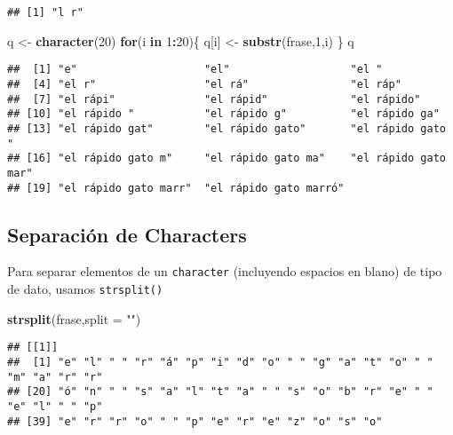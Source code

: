 \documentclass[]{article}
\newenvironment{Shaded}{\begin{snugshade}}{\end{snugshade}}
\newcommand{\KeywordTok}[1]{\textcolor[rgb]{0.13,0.29,0.53}{\textbf{#1}}}
\newcommand{\DataTypeTok}[1]{\textcolor[rgb]{0.13,0.29,0.53}{#1}}
\newcommand{\DecValTok}[1]{\textcolor[rgb]{0.00,0.00,0.81}{#1}}
\newcommand{\StringTok}[1]{\textcolor[rgb]{0.31,0.60,0.02}{#1}}
\newcommand{\ControlFlowTok}[1]{\textcolor[rgb]{0.13,0.29,0.53}{\textbf{#1}}}
\newcommand{\OperatorTok}[1]{\textcolor[rgb]{0.81,0.36,0.00}{\textbf{#1}}}
\newcommand{\NormalTok}[1]{#1}
\begin{document}
\begin{verbatim}
## [1] "l r"
\end{verbatim}

\begin{Shaded}
\begin{Highlighting}[]
\NormalTok{q <-}\StringTok{ }\KeywordTok{character}\NormalTok{(}\DecValTok{20}\NormalTok{)}
\ControlFlowTok{for}\NormalTok{(i }\ControlFlowTok{in} \DecValTok{1}\OperatorTok{:}\DecValTok{20}\NormalTok{)\{}
\NormalTok{  q[i] <-}\StringTok{ }\KeywordTok{substr}\NormalTok{(frase,}\DecValTok{1}\NormalTok{,i)}
\NormalTok{\}}
\NormalTok{q}
\end{Highlighting}
\end{Shaded}

\begin{verbatim}
##  [1] "e"                    "el"                   "el "                 
##  [4] "el r"                 "el rá"                "el ráp"              
##  [7] "el rápi"              "el rápid"             "el rápido"           
## [10] "el rápido "           "el rápido g"          "el rápido ga"        
## [13] "el rápido gat"        "el rápido gato"       "el rápido gato "     
## [16] "el rápido gato m"     "el rápido gato ma"    "el rápido gato mar"  
## [19] "el rápido gato marr"  "el rápido gato marró"
\end{verbatim}

\subsection{Separación de Characters}\label{separaciuxf3n-de-characters}

Para separar elementos de un \texttt{character} (incluyendo espacios en
blano) de tipo de dato, usamos \texttt{strsplit()}

\begin{Shaded}
\begin{Highlighting}[]
\KeywordTok{strsplit}\NormalTok{(frase,}\DataTypeTok{split =} \StringTok{""}\NormalTok{)}
\end{Highlighting}
\end{Shaded}

\begin{verbatim}
## [[1]]
##  [1] "e" "l" " " "r" "á" "p" "i" "d" "o" " " "g" "a" "t" "o" " " "m" "a" "r" "r"
## [20] "ó" "n" " " "s" "a" "l" "t" "a" " " "s" "o" "b" "r" "e" " " "e" "l" " " "p"
## [39] "e" "r" "r" "o" " " "p" "e" "r" "e" "z" "o" "s" "o"
\end{verbatim}
\end{document}
